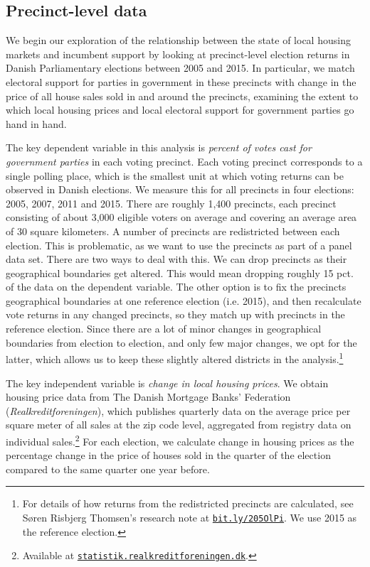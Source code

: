 \documentclass[12pt,a4paper]{article}
\begin{document}
	\subsection{Precinct-level data}\label{precinctlevel}
	We begin our exploration of the relationship between the state of local housing markets and incumbent support by looking at precinct-level election returns in Danish Parliamentary elections between 2005 and 2015. In particular, we match electoral support for parties in government in these precincts with change in the price of all house sales sold in and around the precincts, examining the extent to which local housing prices and local electoral support for government parties go hand in hand.
	

	The key dependent variable in this analysis is \textit{percent of votes cast for government parties} in each voting precinct. Each voting precinct corresponds to a single polling place, which is the smallest unit at which voting returns can be observed in Danish elections. We measure this for all precincts in four elections:  2005, 2007, 2011 and 2015. There are roughly 1,400 precincts, each precinct consisting of about 3,000 eligible voters on average and covering an average area of 30 square kilometers. A number of precincts are redistricted between each election. This is problematic, as we want to use the precincts as part of a panel data set. There are two ways to deal with this. We can drop precincts as their geographical boundaries get altered. This would mean dropping roughly 15 pct. of the data on the dependent variable. The other option is to fix the precincts geographical boundaries at one reference election (i.e. 2015), and then recalculate vote returns in any changed precincts, so they match up with precincts in the reference election. Since there are a lot of minor changes in geographical boundaries from election to election, and only few major changes, we opt for the latter, which allows us to keep these slightly altered districts in the analysis.\footnote{For details of how returns from the redistricted precincts are calculated, see Søren Risbjerg Thomsen's research note at \texttt{\href{http://bit.ly/205OlPi}{bit.ly/205OlPi}}.  We use 2015 as the reference election.}
	
	The key independent variable is \textit{change in local housing prices}. We obtain housing price data from The Danish Mortgage Banks' Federation (\textit{Realkreditforeningen}), which publishes quarterly data on the average price per square meter of all sales at the zip code level, aggregated from registry data on individual sales.\footnote{Available at \texttt{\href{http://statistik.realkreditforeningen.dk/}{statistik.realkreditforeningen.dk}}.} For each election, we calculate change in housing prices as the percentage change in the price of houses sold in the quarter of the election compared to the same quarter one year before.
	
\end{document}
